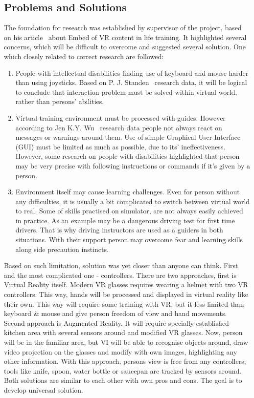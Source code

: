 \documentclass[18pt]{article}
\numberwithin{equation}{section} %
\numberwithin{figure}{section} %
\numberwithin{table}{section} %
\begin{document}
	\subsection{Problems and Solutions}
		The foundation for research was established by supervisor of the project, based on his article~\cite{quteprints100187} about Embed of VR content in life training. It highlighted several concerns, which will be difficult to overcome and suggested several solution. One which closely related to correct research are followed: \\	
		\begin{enumerate}
			\item People with intellectual disabilities finding use of keyboard and mouse harder than using joysticks. Based on P. J. Standen~\cite{control} research data, it will be logical to conclude that interaction problem must be solved within virtual world, rather than persons' abilities.
			\item Virtual training environment must be processed with guides. However according to Jen K.Y. Wu~\cite{WU20058} research data people not always react on messages or warnings around them. Use of simple Graphical User Interface (GUI) must be limited as much as possible, due to its' ineffectiveness. However, some research on people with disabilities highlighted that person may be very precise with following instructions or commands if it's given by a person.
			\item Environment itself may cause learning challenges. Even for person without any difficulties, it is usually a bit complicated to switch between virtual world to real. Some of skills practised on simulator, are not always easily achieved in practice. As an example may be a dangerous driving test for first time drivers. That is why driving instructors are used as a guiders in both situations. With their support person may overcome fear and learning skills along side precaution instincts.
		\end{enumerate}
		Based on such limitation, solution was yet closer than anyone can think. First and the most complicated one - controllers. There are two approaches, first is Virtual Reality itself. Modern VR glasses requires wearing a helmet with two VR controllers. This way, hands will be processed and displayed in virtual reality like their own. This way will require some training with VR, but it less limited than keyboard \& mouse and give person freedom of view and hand movements. \\
		Second approach is Augmented Reality. It will require specially established kitchen area with several sensors around and modified VR glasses. Now, person will be in the familiar area, but VI will be able to recognise objects around, draw video projection on the glasses and modify with own images, highlighting any other information. With this approach, persons view is free from any controllers; tools like knife, spoon, water bottle or saucepan are tracked by sensors around.\\
		Both solutions are similar to each other with own pros and cons. The goal is to develop universal solution. \\
		
\end{document}
